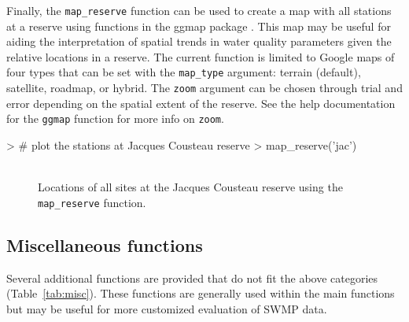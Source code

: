 Finally, the \texttt{map\_reserve} function can be used to create a map with all stations at a reserve using functions in the ggmap package \cite{Kahle13}. This map may be useful for aiding the interpretation of spatial trends in water quality parameters given the relative locations in a reserve.  The current function is limited to Google maps of four types that can be set with the \texttt{map\_type} argument: terrain (default), satellite, roadmap, or hybrid.  The \texttt{zoom} argument can be chosen through trial and error depending on the spatial extent of the reserve.  See the help documentation for the \texttt{ggmap} function for more info on \texttt{zoom}.

\begin{example}
> # plot the stations at Jacques Cousteau reserve
> map_reserve('jac')
\end{example}

\begin{figure}[!h]

{\centering \includegraphics[width=0.00\textwidth]{figure/map_ex-1} 

}

\caption[Locations of all sites at the Jacques Cousteau reserve using the \texttt{map\_reserve} function]{Locations of all sites at the Jacques Cousteau reserve using the \texttt{map\_reserve} function.}\label{fig:map_ex}
\end{figure}



\subsection{Miscellaneous functions}

Several additional functions are provided that do not fit the above categories (Table~\ref{tab:misc}).  These functions are generally used within the main functions but may be useful for more customized evaluation of SWMP data.  

